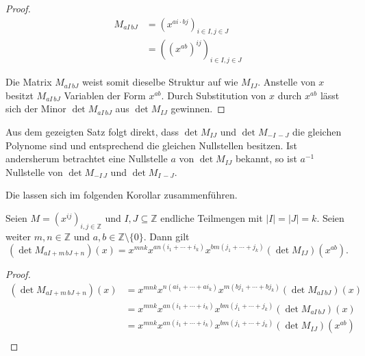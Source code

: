 \begin{proof}    
    \begin{align*}
        M_{aI\,bJ}   &= \left(x^{ai\cdot bj}\right)_{i\in I,j\in J} \\
                    &= \left((x^{ab})^{ij}\right)_{i\in I,j\in J}
    \end{align*}

    Die Matrix $M_{aI\,bJ}$ weist somit dieselbe Struktur auf wie $M_{IJ}$. Anstelle von $x$ besitzt $M_{aI\,bJ}$ Variablen der Form $x^{ab}$. Durch Substitution von $x$ durch $x^{ab}$ lässt sich der Minor $\det M_{aI\,bJ}$ aus $\det M_{IJ}$ gewinnen.
\end{proof}

Aus dem gezeigten Satz folgt direkt, dass $\det{} M_{IJ}$ und $\det{} M_{-I\,-J}$ die gleichen Polynome sind und entsprechend die gleichen Nullstellen besitzen. Ist andersherum betrachtet eine Nullstelle $a$ von $\det M_{IJ}$ bekannt, so ist $a^{-1}$ Nullstelle von $\det M_{-I\,J}$ und $\det M_{I\,-J}$.

Die  lassen sich im folgenden Korollar zusammenführen.

\begin{korollar}
    \sloppy Seien $M = \left( x^{ij} \right)_{i,j \in \mathbb{Z}}$ und $I,J \subseteq \mathbb{Z}$ endliche Teilmengen mit ${|I|=|J|=k}$. Seien weiter $m,n \in \mathbb{Z}$ und $a,b \in \mathbb{Z}\setminus\{0\}$. Dann gilt
    \begin{equation*}
        \left( \det{} M_{aI+m\,bJ+n} \right) (x) = x^{mnk} x^{an(i_1+\cdots +i_k)} x^{bm(j_1 +\cdots + j_k)} \left( \det{} M_{IJ} \right) (x^{ab}).
    \end{equation*}
\end{korollar}

\begin{proof}
    \begin{align*}
        \left( \det{} M_{aI+m\,bJ+n} \right) (x)    &= x^{mnk} x^{n(ai_1+\cdots +ai_k)} x^{m(bj_1 +\cdots + bj_k)} \left( \det{} M_{aI\,bJ} \right) (x) \\
                                                    &= x^{mnk} x^{an(i_1+\cdots +i_k)} x^{bm(j_1 +\cdots + j_k)} \left( \det{} M_{aI\,bJ} \right) (x) \\
                                                    &= x^{mnk} x^{an(i_1+\cdots +i_k)} x^{bm(j_1 +\cdots + j_k)} \left( \det{} M_{IJ} \right) (x^{ab}) \\
    \end{align*}
\end{proof}


